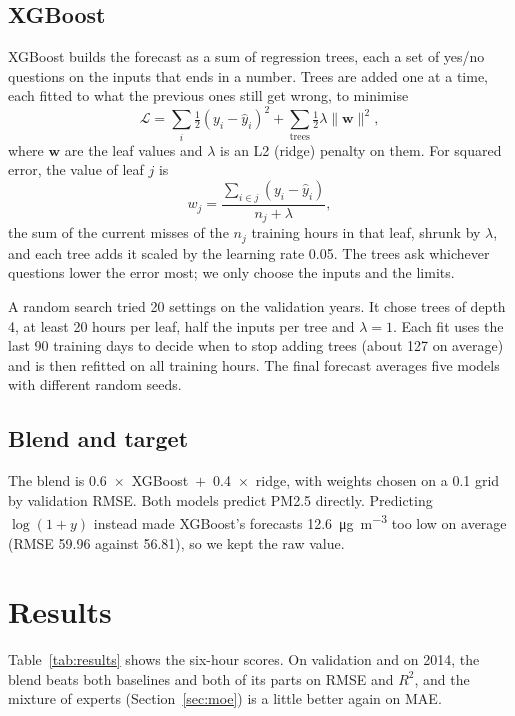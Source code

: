\documentclass[conference]{IEEEtran}
\newcommand{\ugm}{\si{\micro\gram\per\cubic\metre}}
\begin{document}
\subsection{XGBoost}
XGBoost \cite{chen2016} builds the forecast as a sum of regression trees, each a set of yes/no questions on the inputs that ends in a number. Trees are added one at a time, each fitted to what the previous ones still get wrong, to minimise
\begin{equation}
\mathcal{L} = \sum_i \tfrac{1}{2}(y_i - \hat{y}_i)^2 + \sum_{\text{trees}} \tfrac{1}{2}\lambda \lVert \mathbf{w}\rVert^2 ,
\end{equation}
where $\mathbf{w}$ are the leaf values and $\lambda$ is an L2 (ridge) penalty on them. For squared error, the value of leaf $j$ is
\begin{equation}
w_j = \frac{\sum_{i \in j} (y_i - \hat{y}_i)}{n_j + \lambda},
\end{equation}
the sum of the current misses of the $n_j$ training hours in that leaf, shrunk by $\lambda$, and each tree adds it scaled by the learning rate 0.05. The trees ask whichever questions lower the error most; we only choose the inputs and the limits.

A random search tried 20 settings on the validation years. It chose trees of depth 4, at least 20 hours per leaf, half the inputs per tree and $\lambda = 1$. Each fit uses the last 90 training days to decide when to stop adding trees (about 127 on average) and is then refitted on all training hours. The final forecast averages five models with different random seeds.

\subsection{Blend and target}
The blend is 0.6~$\times$~XGBoost~$+$~0.4~$\times$~ridge, with weights chosen on a 0.1 grid by validation RMSE. Both models predict PM2.5 directly. Predicting $\log(1 + y)$ instead made XGBoost's forecasts 12.6~\ugm{} too low on average (RMSE 59.96 against 56.81), so we kept the raw value.

\section{Results}
\label{sec:results}
Table~\ref{tab:results} shows the six-hour scores. On validation and on 2014, the blend beats both baselines and both of its parts on RMSE and $R^2$, and the mixture of experts (Section~\ref{sec:moe}) is a little better again on MAE.
\end{document}
